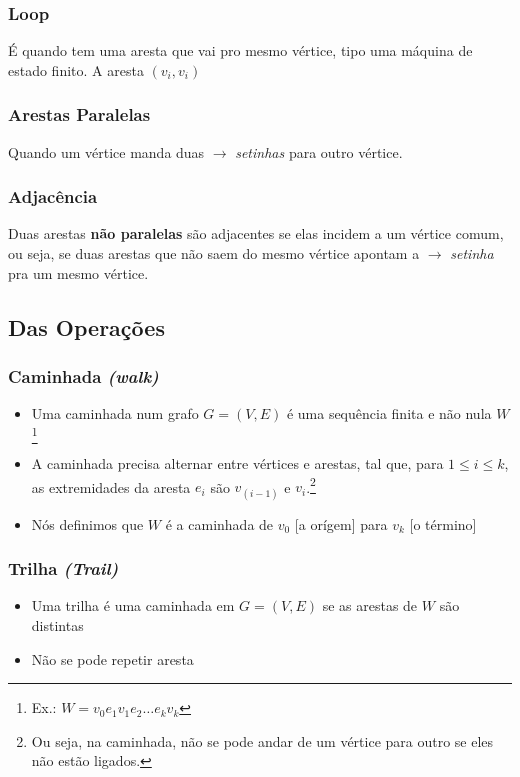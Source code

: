 \documentclass[12pt]{article}
\begin{document}
\subsubsection{Loop}
É quando tem uma aresta que vai pro mesmo vértice, tipo uma máquina de estado finito.
A aresta $(v_i, v_i)$

\subsubsection{Arestas Paralelas}
Quando um vértice manda duas $\longrightarrow$ \textit{setinhas} para outro vértice.

\subsubsection{Adjacência}
Duas arestas \textbf{não paralelas} são adjacentes se elas incidem a um vértice comum, ou seja, se duas arestas que não saem do mesmo vértice apontam a $\longrightarrow$ \textit{setinha} pra um mesmo vértice.


\subsection{Das Operações}

\subsubsection{Caminhada \textit{(walk)}}
\begin{itemize}
	\item Uma caminhada num grafo $G = (V, E)$ é uma sequência finita e não nula $W$\footnote{
		      Ex.: $W = v_0 e_1 v_1 e_2 \dots e_k v_k$
	      }
	\item A caminhada precisa alternar entre vértices e arestas, tal que, para $1 \leq i \leq k$, as extremidades da aresta $e_i$ são $v_(i-1)$ e $v_i$.\footnote{
		      Ou seja, na caminhada, não se pode andar de um vértice para outro se eles não estão ligados.
	      }
	\item Nós definimos que $W$ é a caminhada de $v_0$ [a orígem] para $v_k$ [o término]
\end{itemize}

\subsubsection{Trilha \textit{(Trail)}}
\begin{itemize}
	\item Uma trilha é uma caminhada em $G = (V, E)$ se as arestas de $W$ são distintas
	\item Não se pode repetir aresta
\end{itemize}
\end{document}
